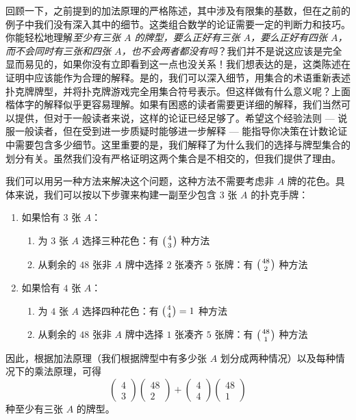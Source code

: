 \begin{example}[至少三张 $A$]
    回顾一下，之前提到的加法原理的严格陈述，其中涉及有限集的基数，但在之前的例子中我们没有深入其中的细节。这类组合数学的论证需要一定的判断力和技巧。你能轻松地理解\emph{至少有三张 $A$ 的牌型，要么正好有三张 $A$，要么正好有四张 $A$，而不会同时有三张和四张 $A$，也不会两者都没有吗}？我们并不是说这应该是完全显而易见的，如果你没有立即看到这一点也没关系！我们想表达的是，这类陈述在证明中应该能作为合理的解释。是的，我们可以深入细节，用集合的术语重新表述扑克牌牌型，并将扑克牌游戏完全用集合符号表示。但这样做有什么意义呢？上面楷体字的解释似乎更容易理解。如果有困惑的读者需要更详细的解释，我们当然可以提供，但对于一般读者来说，这样的论证已经足够了。希望这个经验法则 --- 说服一般读者，但在受到进一步质疑时能够进一步解释 --- 能指导你决策在计数论证中需要包含多少细节。这里重要的是，我们解释了为什么我们的选择与牌型集合的划分有关。虽然我们没有严格证明这两个集合是不相交的，但我们提供了理由。

    我们可以用另一种方法来解决这个问题，这种方法不需要考虑非 $A$ 牌的花色。具体来说，我们可以按以下步骤来构建一副至少包含 $3$ 张 $A$ 的扑克手牌：
    \begin{enumerate}
        \item 如果恰有 $3$ 张 $A$：
              \begin{enumerate}[label=(\alph*)]
                  \item 为 $3$ 张 $A$ 选择三种花色：有 $\big({4 \atop 3}\big)$ 种方法
                  \item 从剩余的 $48$ 张非 $A$ 牌中选择 $2$ 张凑齐 $5$ 张牌：有 $\big({48 \atop 2}\big)$ 种方法
              \end{enumerate}
        \item 如果恰有 $4$ 张 $A$：
              \begin{enumerate}[label=(\alph*)]
                  \item 为 $4$ 张 $A$ 选择四种花色：有 $\big({4 \atop 4}\big) = 1$ 种方法
                  \item 从剩余的 $48$ 张非 $A$ 牌中选择 $1$ 张凑齐 $5$ 张牌：有 $\big({48 \atop 1}\big)$ 种方法
              \end{enumerate}
    \end{enumerate}
    因此，根据加法原理（我们根据牌型中有多少张 $A$ 划分成两种情况）以及每种情况下的乘法原理，可得
    \[\begin{pmatrix}
            4 \\
            3
        \end{pmatrix}\begin{pmatrix}
            48 \\
            2
        \end{pmatrix}+\begin{pmatrix}
            4 \\
            4
        \end{pmatrix}\begin{pmatrix}
            48 \\
            1
        \end{pmatrix}\]
    种至少有三张 $A$ 的牌型。


\end{example}
